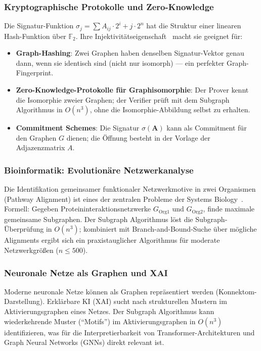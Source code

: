 ﻿\documentclass[a4paper,12pt]{article}
\theoremstyle{definition}
\begin{document}
\subsubsection{Kryptographische Protokolle und Zero-Knowledge}

Die Signatur-Funktion $\sigma_j = \sum A_{ij} \cdot 2^i + j \cdot 2^n$ hat
die Struktur einer linearen Hash-Funktion über $\mathbb{F}_2$.
Ihre Injektivitätseigenschaft~\cite{epp2026subgraph} macht sie geeignet für:
\begin{itemize}
  \item \textbf{Graph-Hashing}: Zwei Graphen haben denselben Signatur-Vektor
        genau dann, wenn sie identisch sind (nicht nur isomorph) ---
        ein perfekter Graph-Fingerprint.
  \item \textbf{Zero-Knowledge-Protokolle für Graphisomorphie}:
        Der Prover kennt die Isomorphie zweier Graphen; der Verifier
        prüft mit dem Subgraph Algorithmus in $O(n^3)$, ohne die Isomorphie-Abbildung
        selbst zu erhalten.
  \item \textbf{Commitment Schemes}: Die Signatur $\sigma(\boldsymbol{A})$ kann
        als Commitment für den Graphen $G$ dienen; die Öffnung besteht
        in der Vorlage der Adjazenzmatrix $A$.
\end{itemize}

\subsubsection{Bioinformatik: Evolutionäre Netzwerkanalyse}

Die Identifikation gemeinsamer funktionaler Netzwerkmotive in zwei Organismen
(Pathway Alignment) ist eines der zentralen Probleme der Systems Biology~\cite{sharan2006comparative}.
Formell: Gegeben Proteininteraktionsnetzwerke $G_\mathrm{Org1}$ und $G_\mathrm{Org2}$,
finde maximale gemeinsame Subgraphen.
Der Subgraph Algorithmus löst die Subgraph-Überprüfung in $O(n^3)$;
kombiniert mit Branch-and-Bound-Suche über mögliche Alignments ergibt sich
ein praxistauglicher Algorithmus für moderate Netzwerkgrößen ($n \leq 500$).

\subsubsection{Neuronale Netze als Graphen und XAI}

Moderne neuronale Netze können als Graphen repräsentiert werden
(Konnektom-Darstellung). Erklärbare KI (XAI) sucht nach strukturellen Mustern
im Aktivierungsgraphen eines Netzes.
Der Subgraph Algorithmus kann wiederkehrende Muster (``Motifs'') im
Aktivierungsgraphen in $O(n^3)$ identifizieren,
was für die Interpretierbarkeit von Transformer-Architekturen und
Graph Neural Networks (GNNs) direkt relevant ist.
\end{document}
